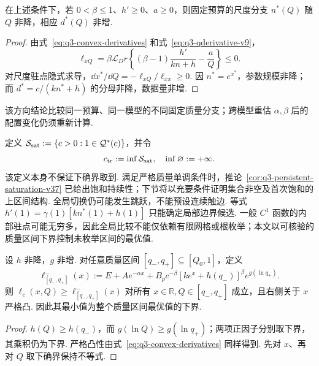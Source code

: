 \begin{corollary}[质量改变时的尺度分配方向]\label{cor:q3-quality-scale-direction}
在上述条件下，若 $0<\beta\le1$、$h'\ge0$、$a\ge0$，则固定预算的尺度分支 $n^*(Q)$ 随 $Q$ 非降，相应 $d^*(Q)$ 非增. 
\end{corollary}
\begin{proof}
由式~\eqref{eq:q3-convex-derivatives} 和式~\eqref{eq:q3-qderivative-v9}，
\[
\ell_{xQ}=\beta\mathcal L_Dr
\left\{(\beta-1)\frac{h'}{kn+h}-\frac aQ\right\}\le0.
\]
对尺度驻点隐式求导，$\dd x^*/\dd Q=-\ell_{xQ}/\ell_{xx}\ge0$. 因 $n^*=e^{x^*}$，参数规模非降；而 $d^*=c/(kn^*+h)$ 的分母非降，数据量非增. 
\end{proof}
该方向结论比较同一预算、同一模型的不同固定质量分支；跨模型重估 $\alpha,\beta$ 后的配置变化仍须重新计算. 

定义 $\mathcal S_{\rm sat}:=\{c>0:1\in\mathcal Q^*(c)\}$，并令
\begin{equation}\label{eq:q3-transition-def-v12}
c_{\rm tr}:=\inf\mathcal S_{\rm sat},\quad\inf\varnothing:=+\infty.
\end{equation}
该定义本身不保证下确界取到. 满足严格质量单调条件时，推论~\ref{cor:q3-persistent-saturation-v37} 已给出饱和持续性；下节将以充要条件证明集合非空及首次饱和的上区间结构. 全局切换仍可能发生跳跃，不能预设连续触边. 等式 $h'(1)=\gamma(1)[kn^*(1)+h(1)]$ 只能确定局部边界候选. 一般 $C^1$ 函数的内部驻点可能无穷多，因此全局比较不能仅依赖有限网格或根枚举；本文以可核验的质量区间下界控制未枚举区间的最优值. 

\begin{lemma}[质量区间的解析下界]\label{prop:q3-quality-lower-bound}
设 $h$ 非降，$g$ 非增. 对任意质量区间 $[q_-,q_+]\subseteq[Q_0,1]$，定义
\begin{equation}\label{eq:q3-interval-lower}
\ell^-_{[q_-,q_+]}(x):=E+Ae^{-\alpha x}
+B_pc^{-\beta}[ke^x+h(q_-)]^\beta e^{g(\ln q_+)}.
\end{equation}
则 $\ell_c(x,Q)\ge\ell^-_{[q_-,q_+]}(x)$ 对所有 $x\in\mathbb R,Q\in[q_-,q_+]$ 成立，且右侧关于 $x$ 严格凸. 因此其最小值为整个质量区间最优值的下界. 
\end{lemma}
\begin{proof}
$h(Q)\ge h(q_-)$，而 $g(\ln Q)\ge g(\ln q_+)$；两项正因子分别取下界，其乘积仍为下界. 严格凸性由式~\eqref{eq:q3-convex-derivatives} 同样得到. 先对 $x$、再对 $Q$ 取下确界保持不等式. 
\end{proof}

